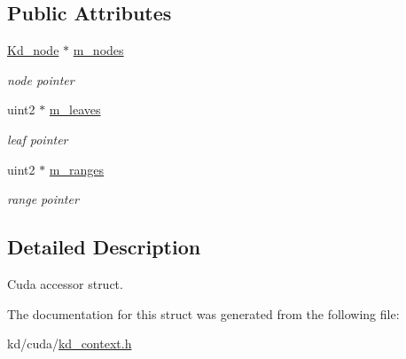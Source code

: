 \subsection*{\-Public \-Attributes}
\begin{DoxyCompactItemize}
\item 
\hypertarget{structnih_1_1cuda_1_1_kd__context_1_1_context_a2581fa4e72d9795595bcf20af9f67957}{
\hyperlink{structnih_1_1_kd__node}{\-Kd\-\_\-node} $\ast$ \hyperlink{structnih_1_1cuda_1_1_kd__context_1_1_context_a2581fa4e72d9795595bcf20af9f67957}{m\-\_\-nodes}}
\label{structnih_1_1cuda_1_1_kd__context_1_1_context_a2581fa4e72d9795595bcf20af9f67957}

\begin{DoxyCompactList}\small\item\em node pointer \end{DoxyCompactList}\item 
\hypertarget{structnih_1_1cuda_1_1_kd__context_1_1_context_af85c642b05e2609db593665f85c5f202}{
uint2 $\ast$ \hyperlink{structnih_1_1cuda_1_1_kd__context_1_1_context_af85c642b05e2609db593665f85c5f202}{m\-\_\-leaves}}
\label{structnih_1_1cuda_1_1_kd__context_1_1_context_af85c642b05e2609db593665f85c5f202}

\begin{DoxyCompactList}\small\item\em leaf pointer \end{DoxyCompactList}\item 
\hypertarget{structnih_1_1cuda_1_1_kd__context_1_1_context_ad4978b7974dc7a2e14e9b3349318a35b}{
uint2 $\ast$ \hyperlink{structnih_1_1cuda_1_1_kd__context_1_1_context_ad4978b7974dc7a2e14e9b3349318a35b}{m\-\_\-ranges}}
\label{structnih_1_1cuda_1_1_kd__context_1_1_context_ad4978b7974dc7a2e14e9b3349318a35b}

\begin{DoxyCompactList}\small\item\em range pointer \end{DoxyCompactList}\end{DoxyCompactItemize}


\subsection{\-Detailed \-Description}
\-Cuda accessor struct. 

\-The documentation for this struct was generated from the following file\-:\begin{DoxyCompactItemize}
\item 
kd/cuda/\hyperlink{kd__context_8h}{kd\-\_\-context.\-h}\end{DoxyCompactItemize}
